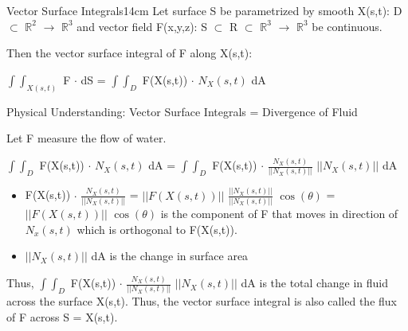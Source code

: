     \begin{definition}{Vector Surface Integrals}{14cm}
        Let surface S be parametrized by smooth X(s,t):
        D $\subset$ $\mathbb{R}^2$ $\rightarrow$ $\mathbb{R}^3$ and
        vector field F(x,y,z): S $\subset$ R $\subset$ $\mathbb{R}^3$
        $\rightarrow$ $\mathbb{R}^3$ be continuous.

        Then the {\color{lblue} vector surface integral} of F along X(s,t):

        \hspace{0.5cm}
        $\int \int_{X(s,t)}$ F $\cdot$ dS
        = $\int \int_D$ F(X(s,t)) $\cdot$ $N_X(s,t)$ dA

        \vspace{0.3cm}

        {\color{red} Physical Understanding: Vector Surface Integrals
        = Divergence of Fluid}

        \hspace{0.5cm}
        \begin{minipage}{13.5cm}
            Let F measure the flow of water.

            \hspace{0.5cm}
            $\int \int_D$ F(X(s,t)) $\cdot$ $N_X(s,t)$ dA
            = $\int \int_D$
                F(X(s,t)) $\cdot$
                $\frac{N_X(s,t)}{||N_X(s,t)||}$ $||N_X(s,t)||$ dA

            \begin{itemize}[leftmargin=0.5cm, itemsep=0.01cm]
                \item F(X(s,t)) $\cdot$ $\frac{N_X(s,t)}{||N_X(s,t)||}$
                    = $||F(X(s,t))||$
                        $\scriptstyle \frac{||N_X(s,t)||}{||N_X(s,t)||}$
                        $\cos(\theta)$
                    = $||F(X(s,t))||$ $\cos(\theta)$
                    is the component of F that moves in direction of $N_x(s,t)$
                    which is orthogonal to F(X(s,t)).

                \item $||N_X(s,t)||$ dA is the change in surface area
            \end{itemize}

            Thus, $\int \int_D$
                F(X(s,t)) $\cdot$
                $\frac{N_X(s,t)}{||N_X(s,t)||}$ $||N_X(s,t)||$ dA
            is the total change in fluid across the surface X(s,t).
            Thus, the vector surface integral is also called the
        {\color{lblue} flux of F across S = X(s,t)}.
        \end{minipage}
    \end{definition}

